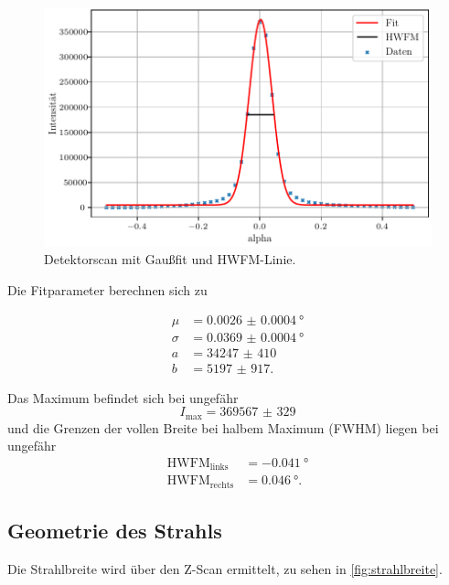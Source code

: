 \begin{figure}[H]
    \centering
    \includegraphics[width=\textwidth]{plots/detectorscan.pdf}
    \caption{Detektorscan mit Gaußfit und HWFM-Linie.}
    \label{fig:detektorscan}
\end{figure}

Die Fitparameter berechnen sich zu

\begin{align*}
    \mu &= \qty{0.0026(4)}{\degree} \\
    \sigma &= \qty{0.0369(4)}{\degree} \\
    a &= \num{34247(410)} \\
    b &= \num{5197(917)}.
\end{align*}

Das Maximum befindet sich bei ungefähr
\begin{equation*}
    I_\text{max} = \num{369567(329)}
\end{equation*}
und die Grenzen der vollen Breite bei halbem Maximum (FWHM) liegen bei ungefähr
\begin{align*}
   \text{HWFM}_\text{links} &= \qty{-0.041}{\degree} \\
   \text{HWFM}_\text{rechts} &= \qty{0.046}{\degree}.
\end{align*}

\subsection{Geometrie des Strahls}

Die Strahlbreite wird über den Z-Scan ermittelt, zu sehen in \autoref{fig:strahlbreite}.

